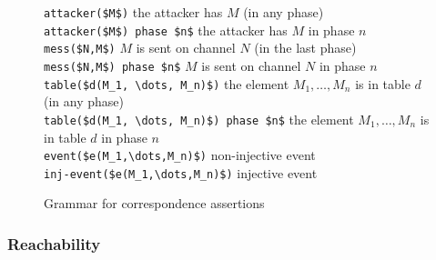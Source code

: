 \documentclass{book}
\begin{document}
\begin{figure}[ht]
\begin{center}
\begin{minipage}{\linewidth}
\begin{tabbing}
\> \lstinline!attacker($M$)! 			        \>\> the attacker has $M$ (in any phase)\\
\> \lstinline!attacker($M$) phase $n$!	                \>\> the attacker has $M$ in phase $n$\\
\> \lstinline!mess($N,M$)!			        \>\> $M$ is sent on channel $N$ (in the last phase)\\
\> \lstinline!mess($N,M$) phase $n$!	                \>\> $M$ is sent on channel $N$ in phase $n$\\
\> \lstinline!table($d(M_1, \dots, M_n)$)! 		\>\> the element $M_1, \ldots, M_n$ is in table $d$ (in any phase)\\
\> \lstinline!table($d(M_1, \dots, M_n)$) phase $n$!	\>\> the element $M_1, \ldots, M_n$ is in table $d$ in phase $n$\\
\> \lstinline!event($e(M_1,\dots,M_n)$)!		\>\> non-injective event\\
\> \lstinline!inj-event($e(M_1,\dots,M_n)$)!		\>\> injective event\\
\end{tabbing}
\end{minipage}
\end{center}
\caption{Grammar for correspondence assertions}
\label{fig:correspondences}
\end{figure}
%


\subsubsection{Reachability} \label{sec:reachability}
\end{document}
